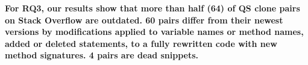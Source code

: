 \documentclass[sigconf,review, anonymous]{acmart}
\begin{document}
\textbf{For RQ3, our results show that more than half (64) of QS clone pairs on Stack Overflow are outdated. 60 pairs differ from their newest versions by modifications applied to variable names or method names, added or deleted statements, to a fully rewritten code with new method signatures. 4 pairs are dead snippets.} %

\end{document}
